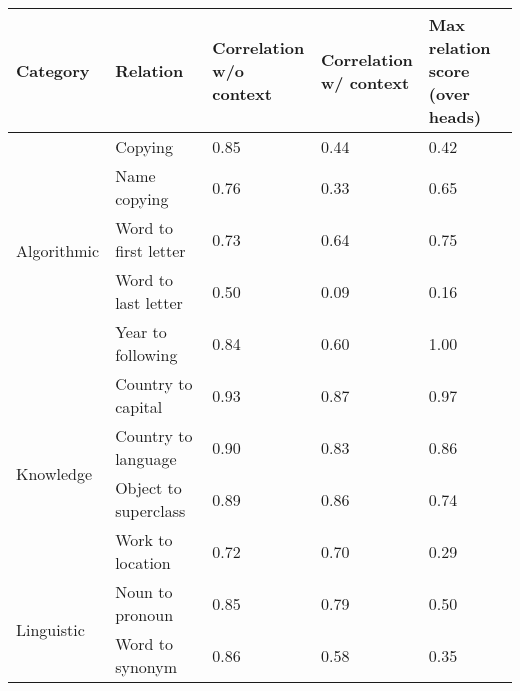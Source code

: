 \begin{tabular}{lllll}
\toprule
Category & Relation & \makecell{Correlation\\w/o context} & \makecell{Correlation\\w/ context} & \makecell{Max relation score\\(over heads)} \\
\midrule
\multirow{5}{*}{Algorithmic} & Copying & 0.85 & 0.44 & 0.42 \\
 & Name copying & 0.76 & 0.33 & 0.65 \\
 & Word to first letter & 0.73 & 0.64 & 0.75 \\
 & Word to last letter & 0.50 & 0.09 & 0.16 \\
 & Year to following & 0.84 & 0.60 & 1.00 \\
\multirow{4}{*}{Knowledge} & Country to capital & 0.93 & 0.87 & 0.97 \\
 & Country to language & 0.90 & 0.83 & 0.86 \\
 & Object to superclass & 0.89 & 0.86 & 0.74 \\
 & Work to location & 0.72 & 0.70 & 0.29 \\
\multirow{2}{*}{Linguistic} & Noun to pronoun & 0.85 & 0.79 & 0.50 \\
 & Word to synonym & 0.86 & 0.58 & 0.35 \\
\bottomrule
\end{tabular}
